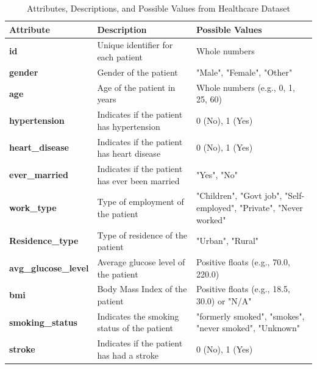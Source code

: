 \documentclass[runningheads]{llncs}
\begin{document}
\begin{enumerate}
\clearpage
\begin{table}[ht]
\centering
\caption{Attributes, Descriptions, and Possible Values from Healthcare Dataset}
\label{tab:healthcare_data_attributes}
\begin{tabular}{|l|p{5cm}|p{4cm}|}
\hline
\textbf{Attribute} & \textbf{Description} & \textbf{Possible Values} \\ 
\hline
\textbf{id} & Unique identifier for each patient & Whole numbers \\ 
\hline
\textbf{gender} & Gender of the patient & "Male", "Female", "Other" \\ 
\hline
\textbf{age} & Age of the patient in years & Whole numbers (e.g., 0, 1, 25, 60) \\ 
\hline
\textbf{hypertension} & Indicates if the patient has hypertension & 0 (No), 1 (Yes) \\ 
\hline
\textbf{heart\_disease} & Indicates if the patient has heart disease & 0 (No), 1 (Yes) \\ 
\hline
\textbf{ever\_married} & Indicates if the patient has ever been married & "Yes", "No" \\ 
\hline
\textbf{work\_type} & Type of employment of the patient & "Children", "Govt job", "Self-employed", "Private", "Never worked" \\ 
\hline
\textbf{Residence\_type} & Type of residence of the patient & "Urban", "Rural" \\ 
\hline
\textbf{avg\_glucose\_level} & Average glucose level of the patient & Positive floats (e.g., 70.0, 220.0) \\ 
\hline
\textbf{bmi} & Body Mass Index of the patient & Positive floats (e.g., 18.5, 30.0) or "N/A" \\ 
\hline
\textbf{smoking\_status} & Indicates the smoking status of the patient & "formerly smoked", "smokes", "never smoked", "Unknown" \\ 
\hline
\textbf{stroke} & Indicates if the patient has had a stroke & 0 (No), 1 (Yes) \\ 
\hline
\end{tabular}
\end{table}

\clearpage


\end{enumerate}
\end{document}
